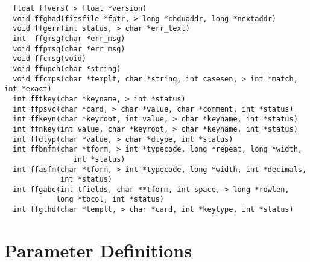 \begin{verbatim}
  float ffvers( > float *version)
  void ffghad(fitsfile *fptr, > long *chduaddr, long *nextaddr)
  void ffgerr(int status, > char *err_text)
  int  ffgmsg(char *err_msg)
  void ffpmsg(char *err_msg)
  void ffcmsg(void)
  void ffupch(char *string)
  void ffcmps(char *templt, char *string, int casesen, > int *match, int *exact)
  int fftkey(char *keyname, > int *status)
  int ffpsvc(char *card, > char *value, char *comment, int *status)
  int ffkeyn(char *keyroot, int value, > char *keyname, int *status)
  int ffnkey(int value, char *keyroot, > char *keyname, int *status)
  int ffdtyp(char *value, > char *dtype, int *status)
  int ffbnfm(char *tform, > int *typecode, long *repeat, long *width,
                int *status)
  int ffasfm(char *tform, > int *typecode, long *width, int *decimals,
             int *status)
  int ffgabc(int tfields, char **tform, int space, > long *rowlen,
            long *tbcol, int *status)
  int ffgthd(char *templt, > char *card, int *keytype, int *status)
\end{verbatim}

\chapter{ Parameter Definitions }

